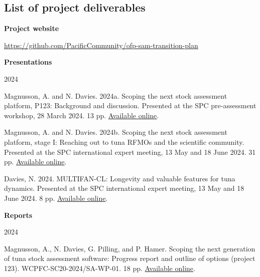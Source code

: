 \documentclass{SCreport}
\begin{document}
\newpage

\subsection{List of project deliverables}
\label{sec:deliverables}

\vspace{1.5ex}

\textbf{Project website}

\href{https://github.com/PacificCommunity/ofp-sam-transition-plan}
{https://github.com/PacificCommunity/ofp-sam-transition-plan}

\vspace{2ex}

\textbf{Presentations}

2024

\begin{description}\setlength\itemsep{0ex}
  \item Magnusson, A. and N. Davies. 2024a. Scoping the next stock assessment
  platform, P123: Background and discussion. Presented at the SPC pre-assessment
  workshop, 28 March 2024. 13 pp.
  \href{https://github.com/PacificCommunity/ofp-sam-transition-plan/blob/main/presentations/2024_03_28_paw_scoping/2024_03_28_paw_scoping.pdf}
  {Available online}.
  \item Magnusson, A. and N. Davies. 2024b. Scoping the next stock assessment
  platform, stage I: Reaching out to tuna RFMOs and the scientific community.
  Presented at the SPC international expert meeting, 13 May and 18 June 2024. 31
  pp.
  \href{https://github.com/PacificCommunity/ofp-sam-transition-plan/blob/main/presentations/2024_05_13_experts_scoping/2024_05_13_experts_scoping.pdf}
  {Available online}.
  \item Davies, N. 2024. MULTIFAN-CL: Longevity and valuable features for tuna
  dynamics. Presented at the SPC international expert meeting, 13 May and 18
  June 2024. 8 pp.
  \href{https://github.com/PacificCommunity/ofp-sam-transition-plan/blob/main/presentations/2024_05_13_mfcl_future/MULTIFAN-CL_future.pdf}
  {Available online}.
\end{description}

\vspace{2ex}

\textbf{Reports}

2024

\begin{description}\setlength\itemsep{0ex}
  \item Magnusson, A., N. Davies, G. Pilling, and P. Hamer. Scoping the next
  generation of tuna stock assessment software: Progress report and outline of
  options (project 123). WCPFC-SC20-2024/SA-WP-01. 18 pp.
  \href{https://github.com/PacificCommunity/ofp-sam-transition-plan/blob/main/documents/2024_08_14_wcpfc_manila/p123_progress_report_sc20.pdf}
  {Available online}.
\end{description}
\end{document}
